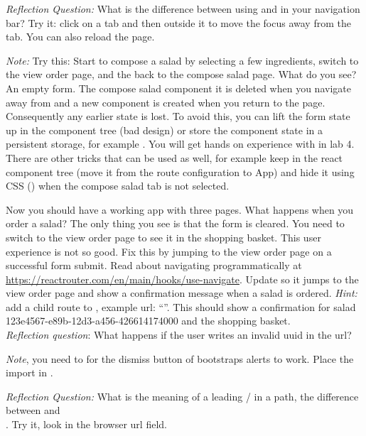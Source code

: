 \documentclass[fleqn, article, a4paper]{memoir}
\begin{document}
\begin{Assignments}
\noindent \emph{Reflection Question:} What is the difference between using  and  in your navigation bar? Try it: click on a tab and then outside it to move the focus away from the tab. You can also reload the page.

\emph{Note:} Try this: Start to compose a salad by selecting a few ingredients, switch to the view order page, and the back to the compose salad page. What do you see? An empty form. The compose salad component it is deleted when you navigate away from and a new component is created when you return to the page. Consequently any earlier state is lost. To avoid this, you can lift the form state up in the component tree (bad design) or store the component state in a persistent storage, for example . You will get hands on experience with  in lab 4. There are other tricks that can be used as well, for example keep  in the react component tree (move it from the route configuration to App) and hide it using CSS () when the compose salad tab is not selected.

\item Now you should have a working app with three pages. What happens when you order a salad? The only thing you see is that the form is cleared. You need to switch to the view order page to see it in the shopping basket. This user experience is not so good. Fix this by jumping to the view order page on a successful form submit. Read about navigating programmatically at \url{https://reactrouter.com/en/main/hooks/use-navigate}. Update  so it jumps to the view order page and show a confirmation message when a salad is ordered. \emph{Hint:} add a child route to , example url: ``''. This should show a confirmation for salad 123e4567-e89b-12d3-a456-426614174000 and the shopping basket. 
\\\emph{Reflection question}: What happens if the user writes an invalid uuid in the url?

\emph{Note}, you need to  for the dismiss button of bootstraps alerts to work. Place the import in .

\emph{Reflection Question:} What is the meaning of a leading / in a path, the difference between  and \\ . Try it, look in the browser url field.


\end{Assignments}
\end{document}
